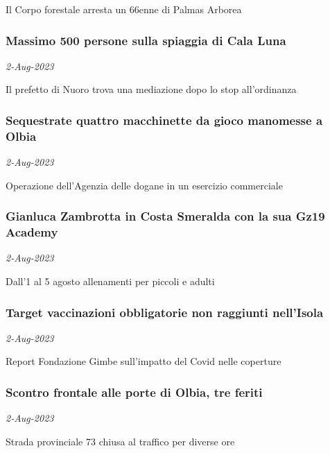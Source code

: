 Il Corpo forestale arresta un 66enne di Palmas Arborea
\subsubsection{Massimo 500 persone sulla spiaggia di Cala Luna \href{https://www.ansa.it/sardegna/notizie/2023/08/02/massimo-500-persone-sulla-spiaggia-di-cala-luna_30053dfe-3acf-492b-8db6-2b2b10cd2017.html}{}}
\textit{2-Aug-2023}

Il prefetto di Nuoro trova una mediazione dopo lo stop all'ordinanza
\subsubsection{Sequestrate quattro macchinette da gioco manomesse a Olbia \href{https://www.ansa.it/sardegna/notizie/2023/08/02/sequestrate-quattro-macchinette-da-gioco-manomesse-a-olbia_f7b60d42-27a1-47ea-b097-78b2ca12700f.html}{}}
\textit{2-Aug-2023}

Operazione dell'Agenzia delle dogane in un esercizio commerciale
\subsubsection{Gianluca Zambrotta in Costa Smeralda con la sua Gz19 Academy \href{https://www.ansa.it/sardegna/notizie/2023/08/02/gianluca-zambrotta-in-costa-smeralda-con-la-sua-gz19-academy_968fe6fe-a15a-4a4f-a9d9-5b02bf2d12e6.html}{}}
\textit{2-Aug-2023}

Dall'1 al 5 agosto allenamenti per piccoli e adulti
\subsubsection{Target vaccinazioni obbligatorie non raggiunti nell'Isola \href{https://www.ansa.it/sardegna/notizie/2023/08/02/target-vaccinazioni-obbligatorie-non-raggiunti-nellisola_736a1834-0a74-46ed-a836-c66666c000f4.html}{}}
\textit{2-Aug-2023}

Report Fondazione Gimbe sull'impatto del Covid nelle coperture
\subsubsection{Scontro frontale alle porte di Olbia, tre feriti \href{https://www.ansa.it/sardegna/notizie/2023/08/02/scontro-frontale-alle-porte-di-olbia-tre-feriti_33d1f60f-3cb5-428b-bca5-b33faeb7fec3.html}{}}
\textit{2-Aug-2023}

Strada provinciale 73 chiusa al traffico per diverse ore
